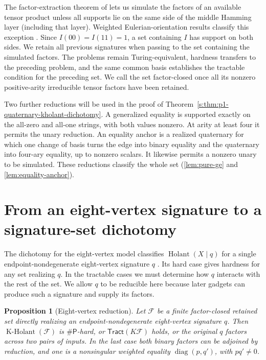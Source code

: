 \documentclass[11pt,letterpaper,onecolumn]{article}
\theoremstyle{plain}
\newtheorem{proposition}[proposition]{Proposition}
\theoremstyle{definition}
\theoremstyle{remark}
\newcommand{\cF}{\mathcal F}
\newcommand{\Holant}{\operatorname{Holant}}
\newcommand{\KHolant}{\operatorname{K\text{-}Holant}}
\newcommand{\Tract}{\mathsf{Tract}}
\newcommand{\SharpP}{\#\mathsf P}
\newcommand{\diag}{\operatorname{diag}}
\begin{document}
The factor-extraction theorem of \cite{MengWangXiaZheng2025} lets us
simulate the factors of an available tensor product unless all supports
lie on the same side of the middle Hamming layer (including that layer).
Weighted Eulerian-orientation results classify this exception
\cite{MengWangXia2025EO,GuanShaoShi2026}. Since \(I(00)=I(11)=1\),
a set containing \(I\) has support on both sides. We retain all
previous signatures when passing to the set containing the simulated
factors. The problems remain Turing-equivalent, hardness transfers to
the preceding problem, and the same common basis establishes the
tractable condition for the preceding set.
We call the set factor-closed once all its nonzero positive-arity
irreducible tensor factors have been retained.

Two further reductions will be used in the proof of Theorem~\ref{s:thm:p1-quaternary-kholant-dichotomy}.
A generalized equality is supported exactly on the all-zero and all-one
strings, with both values nonzero. At arity at least four it permits
the unary reduction. An equality anchor is a realized quaternary for
which one change of basis turns the edge into binary equality and the
quaternary into four-ary equality, up to nonzero scalars. It likewise
permits a nonzero unary to be simulated. These reductions classify the
whole set (\cref{lem:pure-ge} and
\cref{lem:equality-anchor}).

\section{From an eight-vertex signature to a signature-set dichotomy}
\label{s:short:eight}
The dichotomy for the eight-vertex model classifies \(\Holant(X\mid q)\)
for a single endpoint-nondegenerate eight-vertex signature \(q\)
\cite[arXiv version~2, Theorem~3.1]{CaiFu2023}. Its hard case gives
hardness for any set realizing \(q\). In the tractable cases we must
determine how \(q\) interacts with the rest of the set. We allow \(q\)
to be reducible here because later gadgets can produce such a signature
and supply its factors.

\begin{proposition}[Eight-vertex reduction]
\label{s:short:eight-reduction}
Let \(\cF\) be a finite factor-closed retained set directly realizing an
endpoint-nondegenerate eight-vertex signature \(q\). Then
\(\KHolant(\cF)\) is \(\SharpP\)-hard, or \(\Tract(K\cF)\) holds,
or the original \(q\) factors across two pairs of inputs. In the last
case both binary factors can be adjoined by reduction, and one is a
nonsingular weighted equality \(\diag(p,q')\), with \(pq'\ne0\).
\end{proposition}
\end{document}
